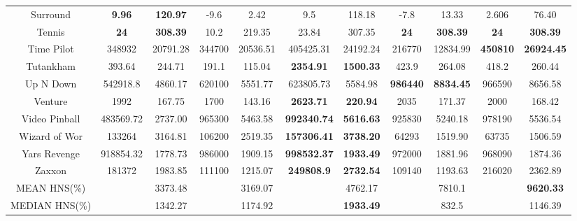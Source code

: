 \documentclass[nohyperref]{article}
\def\GDIHmeanhns{9620.33}
\def\GDIHmedianhns{1146.39}
\def\GDIImeanhns{7810.1}
\def\GDIImedianhns{832.5}
\def\rtdtmeanhns{3373.48}
\def\rtdtmedianhns{1342.27}
\def\ngumeanhns{3169.07}
\def\ngumedianhns{1174.92}
\def\agentmeanhns{4762.17}
\def\agentmedianhns{1933.49}
\newcommand{\best}[1]{\textbf{#1}}
\theoremstyle{plain}
\begin{document}
\begin{table}[!hb]
\begin{center}
\begin{tabular}{| c| c c| c c| c c| c c| c c|}
 Surround    & \textbf{9.96}       & \textbf{120.97}  & -9.6     & 2.42    & 9.5&118.18             &-7.8              &13.33                 &2.606           &76.40\\
 Tennis  & \textbf{24}             & \textbf{308.39}  & 10.2     & 219.35 & 23.84& 307.35           &\best{24}         &\best{308.39}         &\textbf{24}     &\textbf{308.39}             \\
 Time Pilot & 348932    & 20791.28 & 344700 & 20536.51&405425.31&24192.24         &216770            &12834.99              &\textbf{450810}	          &\textbf{26924.45}\\
 Tutankham  & 393.64    & 244.71   & 191.1   & 115.04   & \textbf{2354.91}&\textbf{1500.33}         &423.9             &264.08                &418.2           &260.44\\
 Up N Down  & 542918.8  & 4860.17  & 620100  & 5551.77  & 623805.73 & 5584.98                       &\best{986440}     &\best{8834.45}        &966590          &8656.58\\
 Venture    & 1992      & 167.75   & 1700    & 143.16   &\textbf{2623.71}  &\textbf{220.94}         &2035              &171.37                &2000	            &168.42\\
 Video Pinball & 483569.72 & 2737.00 & 965300 & 5463.58 &\textbf{992340.74}&\textbf{5616.63}        &925830            &5240.18               &978190          &5536.54\\
 Wizard of Wor & 133264 & 3164.81  & 106200  & 2519.35  &\textbf{157306.41}&\textbf{3738.20}        &64293             &1519.90               &63735           &1506.59\\
 Yars Revenge & 918854.32 & 1778.73 & 986000 & 1909.15  &\textbf{998532.37}&\textbf{1933.49}        &972000            &1881.96               &968090          &1874.36\\
 Zaxxon & 181372        & 1983.85  & 111100  & 1215.07  &\textbf{249808.9} &\textbf{2732.54}        &109140            &1193.63               &216020	         &2362.89\\
\hline
MEAN HNS(\%)            &               & \rtdtmeanhns  &         &  \ngumeanhns &           & \agentmeanhns  &     & \GDIImeanhns &      & \textbf{\GDIHmeanhns} \\
\hline
MEDIAN HNS(\%) &            &\rtdtmedianhns   &         & \ngumedianhns  &           & \textbf{\agentmedianhns}  &     & \GDIImedianhns &      & \GDIHmedianhns \\
\hline
\end{tabular}
\end{center}
\end{table}
\clearpage
\end{document}
